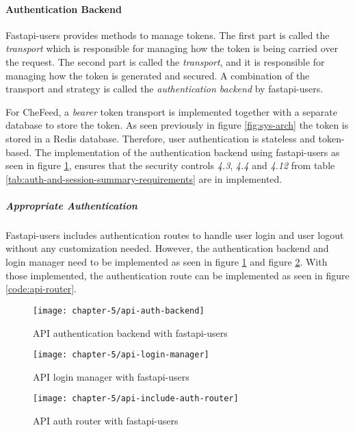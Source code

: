 \paragraph{Authentication Backend}
Fastapi-users provides methods to manage tokens. The first part is called the \emph{transport} which is responsible for managing how the token is being carried over the request. The second part is called the \emph{transport}, and it is responsible for managing how the token is generated and secured. A combination of the transport and strategy is called the \emph{authentication backend} by fastapi-users.

For CheFeed, a \emph{bearer} token transport is implemented together with a separate database to store the token. As seen previously in figure \ref{fig:sys-arch} the token is stored in a Redis database. Therefore, user authentication is stateless and token-based. The implementation of the authentication backend using fastapi-users as seen in figure \ref{code:api-auth-backend}, ensures that the security controls \emph{4.3}, \emph{4.4} and \emph{4.12} from table \ref{tab:auth-and-session-summary-requirements} are in implemented. 

\subparagraph{Appropriate Authentication}
Fastapi-users includes authentication routes to handle user login and user logout without any customization needed. However, the authentication backend and login manager need to be implemented as seen in figure \ref{code:api-auth-backend} and figure \ref{code:api-login-manager}. With those implemented, the authentication route can be implemented as seen in figure \ref{code:api-router}.

\begin{figure}
    \centering
    \texttt{[image: chapter-5/api-auth-backend]}
    \caption{API authentication backend with fastapi-users}
    \label{code:api-auth-backend}
\end{figure}

\begin{figure}
    \centering
    \texttt{[image: chapter-5/api-login-manager]}
    \caption{API login manager with fastapi-users}
    \label{code:api-login-manager}
\end{figure}

\begin{figure}
    \centering
    \texttt{[image: chapter-5/api-include-auth-router]}
    \caption{API auth router with fastapi-users}
    \label{code:api-auth-router}
\end{figure}

